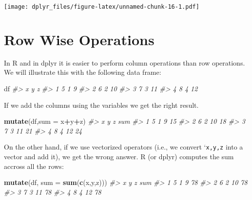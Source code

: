 \documentclass[
]{book}
\newenvironment{Shaded}{\begin{snugshade}}{\end{snugshade}}
\newcommand{\AttributeTok}[1]{\textcolor[rgb]{0.13,0.29,0.53}{#1}}
\newcommand{\CommentTok}[1]{\textcolor[rgb]{0.56,0.35,0.01}{\textit{#1}}}
\newcommand{\FunctionTok}[1]{\textcolor[rgb]{0.13,0.29,0.53}{\textbf{#1}}}
\newcommand{\NormalTok}[1]{#1}
\newcommand{\SpecialCharTok}[1]{\textcolor[rgb]{0.81,0.36,0.00}{\textbf{#1}}}
\theoremstyle{definition}
\theoremstyle{definition}
\theoremstyle{definition}
\theoremstyle{definition}
\theoremstyle{remark}
\begin{document}
\texttt{[image: dplyr\_files/figure-latex/unnamed-chunk-16-1.pdf]}

\hypertarget{row-wise-operations}{%
\chapter{Row Wise Operations}\label{row-wise-operations}}

In R and in dplyr it is easier to perform column operations than row operations. We will illustrate this with the following data frame:

\begin{Shaded}
\begin{Highlighting}[]
\NormalTok{df}
\CommentTok{\#\textgreater{}   x y  z}
\CommentTok{\#\textgreater{} 1 5 1  9}
\CommentTok{\#\textgreater{} 2 6 2 10}
\CommentTok{\#\textgreater{} 3 7 3 11}
\CommentTok{\#\textgreater{} 4 8 4 12}
\end{Highlighting}
\end{Shaded}

If we add the columns using the variables we get the right result.

\begin{Shaded}
\begin{Highlighting}[]
\FunctionTok{mutate}\NormalTok{(df,}\AttributeTok{sum =}\NormalTok{ x}\SpecialCharTok{+}\NormalTok{y}\SpecialCharTok{+}\NormalTok{z)}
\CommentTok{\#\textgreater{}   x y  z sum}
\CommentTok{\#\textgreater{} 1 5 1  9  15}
\CommentTok{\#\textgreater{} 2 6 2 10  18}
\CommentTok{\#\textgreater{} 3 7 3 11  21}
\CommentTok{\#\textgreater{} 4 8 4 12  24}
\end{Highlighting}
\end{Shaded}

On the other hand, if we use vectorized operators (i.e., we convert `\texttt{x,y,z} into a vector and add it), we get the wrong answer. R (or dplyr) computes the sum accross all the rows:

\begin{Shaded}
\begin{Highlighting}[]
\FunctionTok{mutate}\NormalTok{(df, }\AttributeTok{sum =} \FunctionTok{sum}\NormalTok{(}\FunctionTok{c}\NormalTok{(x,y,z)))}
\CommentTok{\#\textgreater{}   x y  z sum}
\CommentTok{\#\textgreater{} 1 5 1  9  78}
\CommentTok{\#\textgreater{} 2 6 2 10  78}
\CommentTok{\#\textgreater{} 3 7 3 11  78}
\CommentTok{\#\textgreater{} 4 8 4 12  78}
\end{Highlighting}
\end{Shaded}
\end{document}
